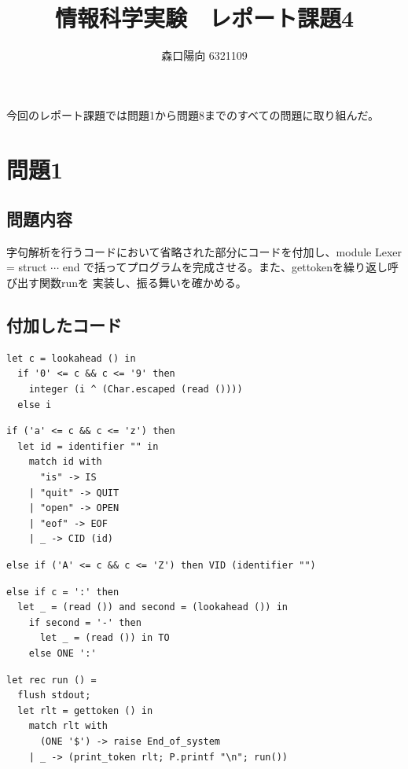 \documentclass{ltjsarticle}
\title{情報科学実験　レポート課題4}
\author{森口陽向  6321109}
\begin{document}
\maketitle


今回のレポート課題では問題1から問題8までのすべての問題に取り組んだ。

\section{問題1}
\subsection{問題内容}
字句解析を行うコードにおいて省略された部分にコードを付加し、module Lexer = struct $\cdots$ end
で括ってプログラムを完成させる。また、gettokenを繰り返し呼び出す関数runを
実装し、振る舞いを確かめる。

\subsection{付加したコード}
\begin{lstlisting}[caption = (*文字列として数字を構成*)の部分]
  let c = lookahead () in 
  if '0' <= c && c <= '9' then 
    integer (i ^ (Char.escaped (read ())))
  else i
\end{lstlisting}
\begin{lstlisting}[caption = (*CIDに対する識別子および予約語*)の部分]
  if ('a' <= c && c <= 'z') then 
  let id = identifier "" in
    match id with 
      "is" -> IS
    | "quit" -> QUIT
    | "open" -> OPEN
    | "eof" -> EOF
    | _ -> CID (id)
\end{lstlisting}
\begin{lstlisting}[caption = (*VIDに対する識別子*)の部分]
  else if ('A' <= c && c <= 'Z') then VID (identifier "")
\end{lstlisting}
\begin{lstlisting}[caption = (*:-を認識してTOを返す*)の部分]
  else if c = ':' then 
  let _ = (read ()) and second = (lookahead ()) in
    if second = '-' then 
      let _ = (read ()) in TO
    else ONE ':'
\end{lstlisting}
\begin{lstlisting}[caption = 関数runの実装]
  let rec run () =
  flush stdout;
  let rlt = gettoken () in
    match rlt with
      (ONE '$') -> raise End_of_system
    | _ -> (print_token rlt; P.printf "\n"; run())
\end{lstlisting}
\end{document}
